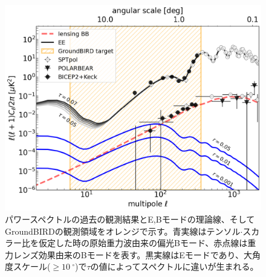 \begin{figure}[htbp]
  \centering
  \includegraphics[width=0.8\columnwidth]{3_GB/figs/cl_shonda.pdf}
  \caption{パワースペクトルの過去の観測結果とE,Bモードの理論線、そしてGroundBIRDの観測領域\cite{spie_honda}をオレンジで示す。青実線はテンソル$\cdot$スカラー比を仮定した時の原始重力波由来の偏光Bモード、赤点線は重力レンズ効果由来のBモードを表す。黒実線はEモードであり、大角度スケール($\geq\SI{10}{^{\circ}}$)で$\tau$の値によってスペクトルに違いが生まれる。}
  \label{cl_honda}
\end{figure}



